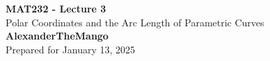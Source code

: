 \begin{titlepage}
    \null %
    \vfill
    \begin{center}
        {\fontsize{40}{48}\selectfont \bfseries MAT232 - Lecture 3}
        \vspace{20pt} \\
        {\LARGE Polar Coordinates and the Arc Length of Parametric Curves} \\
        \vspace{20pt}
        \textbf{AlexanderTheMango}
        \vspace{8pt}
        \\ Prepared for January 13, 2025
    \end{center}
    \vfill
\end{titlepage}
